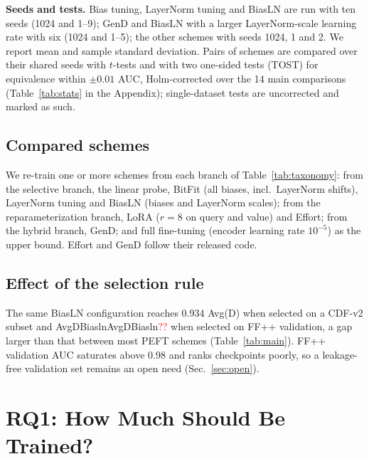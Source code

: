 \documentclass[fonts]{icst}
\newcommand{\num}[1]{\ifcsname #1\endcsname\csname #1\endcsname\else\textcolor{red}{??}\fi}
\begin{document}
\textbf{Seeds and tests.} Bias tuning, LayerNorm tuning and BiasLN are run with ten seeds (1024 and 1--9); GenD and BiasLN with a larger LayerNorm-scale learning rate with six (1024 and 1--5); the other schemes with seeds 1024, 1 and 2. We report mean and sample standard deviation. Pairs of schemes are compared over their shared seeds with $t$-tests and with two one-sided tests (TOST) for equivalence within $\pm0.01$ AUC, Holm-corrected over the 14 main comparisons (Table~\ref{tab:stats} in the Appendix); single-dataset tests are uncorrected and marked as such.


\subsection{Compared schemes}
We re-train one or more schemes from each branch of Table~\ref{tab:taxonomy}: from the selective branch, the linear probe, BitFit (all biases, incl.\ LayerNorm shifts), LayerNorm tuning and BiasLN (biases and LayerNorm scales); from the reparameterization branch, LoRA ($r{=}8$ on query and value) and Effort; from the hybrid branch, GenD; and full fine-tuning (encoder learning rate $10^{-5}$) as the upper bound. Effort and GenD follow their released code.

\subsection{Effect of the selection rule}
\label{sec:selection}
The same BiasLN configuration reaches 0.934 Avg(D) when selected on a CDF-v2 subset and \num{AvgDBiasln} when selected on FF++ validation, a gap larger than that between most PEFT schemes (Table~\ref{tab:main}). FF++ validation AUC saturates above 0.98 and ranks checkpoints poorly, so a leakage-free validation set remains an open need (Sec.~\ref{sec:open}).

\section{RQ1: How Much Should Be Trained?}
\label{sec:main}


\begin{table}[!t]
\centering
\caption{Ablation of selective and low-rank schemes and of $L_2$ normalization before the classifier (same protocol). Bold: best; shaded: second best.}
\label{tab:ablation}
\resizebox{0.85\textwidth}{!}{}
\end{table}
\end{document}
